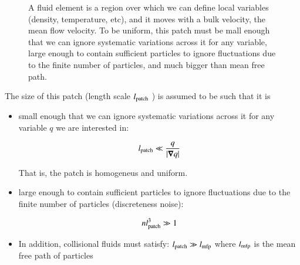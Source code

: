 \begin{figure}
  \begin{center}
  \end{center}
  \caption[]{A fluid element is a region
over which we can define
local variables (density, temperature, etc), and it moves with a bulk velocity, the
mean flow velocity. To be uniform, this patch
must be mall enough that we
can ignore systematic
variations across it for
any variable, large enough to contain
sufficient particles to
ignore fluctuations due
to the finite
number of particles, and much bigger than mean
free path.}
  \label{fig:riogrande}
\end{figure}


The size of this patch (length scale $l_{\rm patch}$ ) is assumed to
be such that it is

\begin{itemize}

\item small enough that we can ignore systematic variations across it for any
variable $q$ we are interested in:

\begin{equation}
l_{\rm patch} \ll \frac{q}{|{\boldsymbol{\nabla}}{q}|}
\end{equation}

That is, the patch is homogeneus and uniform. 

\item large enough to contain sufficient particles to ignore fluctuations due to
the finite number of particles (discreteness noise):

\begin{equation}
nl^3_{\rm patch} \gg 1
\end{equation}


\item In addition, collisional fluids must satisfy: $l_{\rm patch} \gg
  l_{\rm mfp}$ where $l_{\rm mfp}$ is the mean free path of particles

\end{itemize}
  
